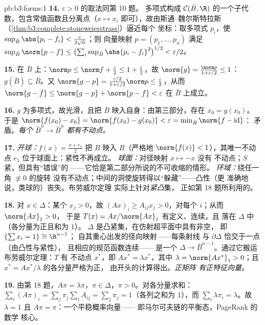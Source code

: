 \begin{solution}{pb:b3:forms:1}
\textbf{14.} $\varepsilon > 0$ 的取法同第 10 题。
多项式构成 $\mathcal C(\bar B,
\R)$ 的一个子代数，包含常值函数且分离点（$x
\mapsto x_i$ 即可），故由斯通–魏尔斯特拉斯
（\cref{thm:b3:complete:stoneweierstrass}）逼近每个
坐标：取多项式 $p_i$，使 $\sup_{\bar
B}\abs{p_i - f_i} < \frac{\varepsilon}{2\sqrt n}$；则
向量映射 $p = (p_1, \dots, p_n)$ 满足
$\sup_{\bar B}\norm{p - f} \leq
\bigl(\sum_i\sup_{\bar B}\abs{p_i - f_i}^2\bigr)^{1/2} <
\varepsilon/2$。

\textbf{15.} 在 $\bar B$ 上：$\norm p \leq \norm f +
\frac\varepsilon2 \leq 1 + \frac\varepsilon2$，故
$\norm{g} = \frac{\norm p}{1 + \varepsilon/2} \leq 1$：
$g(\bar B) \subseteq \bar B$。又 $\norm{g - p} =
\frac{\varepsilon/2}{1 + \varepsilon/2}\norm p \leq
\frac\varepsilon2$，从而 $\norm{g - f} \leq \norm{g - p} +
\norm{p - f} < \varepsilon$ 在 $\bar B$ 上成立。

\textbf{16.} $g$ 为多项式，故光滑，且把
$\bar B$ 映入自身：由第三部分，存在 $x_0 = g(x_0)$。
于是 $\norm{f(x_0) - x_0} = \norm{f(x_0) - g(x_0)} <
\varepsilon = \min_{\bar B}\norm{f - \operatorname{id}}$：
矛盾。\emph{每个 $\bar B^n \to
\bar B^n$ 都有不动点。}

\textbf{17.} \emph{开球：}$f(x) = \frac{x + e_1}2$ 把
$B$ 映入 $B$（严格地 $\norm{f(x)} < 1$），其唯一不动点
$e_1$ 位于球面上：紧性不再成立。
\emph{球面：}对径映射 $x \mapsto -x$ 没有
不动点；$S$ 紧，但具有“错误”的
——它恰是第二部分所说的不可收缩的情形。
\emph{环域：}绕任一角 $\not\equiv 0$ 的旋转
没有不动点；中间的洞使旋转得以“躲藏”——凸性（更
准确地说，类球的）丧失。布劳威尔定理
实际上针对\emph{紧凸}集，
正如第 18 题所利用的。

\textbf{18.} 对 $x \in \Delta$：某个 $x_j > 0$，故 $(Ax)_i
\geq A_{ij}x_j > 0$，对每个 $i$；从而 $\norm{Ax}_1 > 0$，
于是 $T(x) = Ax/\norm{Ax}_1$ 有定义、连续，且
落在 $\Delta$ 中（各分量为正且和为 $1$）。
$\Delta$ 是凸紧集，在仿射超平面中具有非空，
即 $\{\sum x_i = 1\} \cong \R^{n-1}$；
自其重心出发的径向映射——每条射线
与 $\partial\Delta$ 恰交于一点（由凸性与紧性），
且相应的规范函数连续——
是一个 $\Delta \to
\bar B^{n-1}$。通过它搬运布劳威尔定理：$T$ 有
不动点 $x^*$，即 $Ax^* = \lambda x^*$，其中 $\lambda
= \norm{Ax^*}_1 > 0$；且 $x^* = Ax^*/\lambda$ 的各分量严格为正，
由开头的计算得出。\emph{正矩阵
有正特征向量。}

\textbf{19.} 由第 18 题，$A\pi = \lambda\pi$，$\pi \in
\Delta$，$\pi > 0$。对各分量求和：$\sum_i(A\pi)_i =
\sum_j\pi_j\sum_iA_{ij} = \sum_j\pi_j = 1$（各列之和为
$1$），而 $\sum_i\lambda\pi_i = \lambda$。故 $\lambda = 1$
且 $A\pi = \pi$：一个平稳概率向量——
即马尔可夫链的平衡态，PageRank 的数学
核心。


\end{solution}
